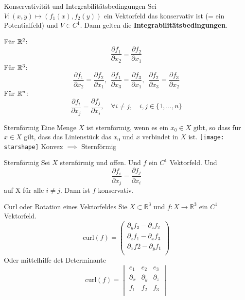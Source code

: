 \begin{Satz}{Konservativität und Integrabilitätsbedingungen}{}
    Sei $V: (x, y) \mapsto (f_1(x), f_2(y))$ ein Vektorfeld das konservativ ist (= ein Potentialfeld) und $V \in C^1$.
    Dann gelten die \textbf{Integrabilitätsbedingungen}.
    \begin{multicols}{2}
    Für $\mathbb{R}^2$:
    \[ \frac{\partial f_1}{\partial x_2} = \frac{\partial f_2}{\partial x_1} \]
    Für $\mathbb{R}^3$:
    \[ \frac{\partial f_1}{\partial x_2} =  \frac{\partial f_2}{\partial x_1}, 
    ~~  \frac{\partial f_1}{\partial x_3} = \frac{\partial f_3}{\partial x_1},
    ~~ \frac{\partial f_2}{\partial x_3} =  \frac{\partial f_3}{\partial x_2}
    \]
    Für $\mathbb{R}^n$:
    \[
        \frac{\partial f_i}{\partial x_j} =  \frac{\partial f_j}{\partial x_i},
        \quad
        \forall i \neq j,
        \quad
        i, j \in \{1,...,n\}
    \]
    \end{multicols}
\end{Satz}

\begin{Definition}{Sternförmig}{}
    Eine Menge $X$ ist sternförmig, wenn es ein $x_0 \in X$ gibt, so dass für $x \in X$ gilt, dass das Linienstück das $x_0$ und $x$ verbindet in $X$ ist. 
    \texttt{[image: starshape]}
    Konvex $\implies$ Sternförmig
\end{Definition}

\begin{Satz}{Sternförmig}{}
    Sei $X$ sternförmig und offen. Und $f$ ein $C^1$ Vektorfeld. Und 
    \[\frac{\partial f_i}{\partial x_j}=\frac{\partial f_j}{\partial x_i}\] auf X für alle $i \neq j$.
    Dann ist $f$ konservativ.

\end{Satz}

\begin{Definition}{Curl oder Rotation eines Vektorfeldes}{}
    Sie $X\subset \mathbb{R}^3$ und $f:X \rightarrow \mathbb{R}^3$ ein $C^1$ Vektorfeld.
    \[   
        \text{curl}(f) =
        \left(
        \begin{array}{c}
        \partial_{y}f_3 - \partial_zf_2\\
        \partial_zf_1 - \partial_x f_3\\
        \partial_xf2-\partial_yf_1\\
        \end{array}
        \right)
    \]
    Oder mittelhilfe det Determinante
    \[
        \text{curl}(f)=
        \begin{vmatrix}
        e_1 & e_2 & e_3\\
        \partial_x & \partial_y & \partial_z \\
        f_1 & f_2 & f_3\\
        \end{vmatrix}
    \]
\end{Definition}